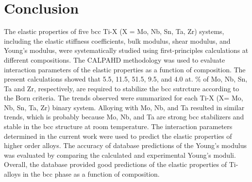 \section{Conclusion}

The elastic properties of five bcc Ti-X (X = Mo, Nb, Sn, Ta, Zr) systems, including the elastic stiffness coefficients, bulk modulus, shear modulus, and Young's modulus, were systematically studied using first-principles calculations at different compositions. The CALPAHD methodology was used to evaluate interaction parameters of the elastic properties as a function of composition. The present calculations showed that 5.5, 11.5, 51.5, 9.5, and 4.0 at. \% of Mo, Nb, Sn, Ta and Zr, respectively, are required to stabilize the bcc sutrcture according to the Born criteria. The trends observed were summarized for each Ti-X (X= Mo, Nb, Sn, Ta, Zr) binary system. Alloying with Mo, Nb, and Ta resulted in similar trends, which is probably because Mo, Nb, and Ta are strong bcc stabilizers and stable in the bcc structure at room temperature. The interaction parameters determined in the current work were used to predict the elastic properties of higher order alloys. The accuracy of database predictions of the Young's modulus was evaluated by comparing the calculated and experimental Young's moduli. Overall, the database provided good predictions of the elastic properties of Ti-alloys in the bcc phase as a function of composition. 

